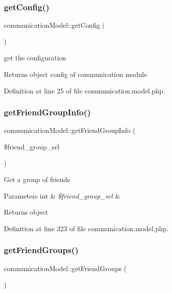 \subsubsection{\texorpdfstring{get\+Config()}{getConfig()}}
{\footnotesize\ttfamily communication\+Model\+::get\+Config (\begin{DoxyParamCaption}{ }\end{DoxyParamCaption})}

get the configuration \begin{DoxyReturn}{Returns}
object config of communication module 
\end{DoxyReturn}


Definition at line 25 of file communication.\+model.\+php.

\hypertarget{classcommunicationModel_a4ccd810d8c48ef4856da8fe986beb60a}{}\label{classcommunicationModel_a4ccd810d8c48ef4856da8fe986beb60a} 
\subsubsection{\texorpdfstring{get\+Friend\+Group\+Info()}{getFriendGroupInfo()}}
{\footnotesize\ttfamily communication\+Model\+::get\+Friend\+Group\+Info (\begin{DoxyParamCaption}\item[{}]{\$friend\+\_\+group\+\_\+srl }\end{DoxyParamCaption})}

Get a group of friends 
\begin{DoxyParams}[1]{Parameters}
int & {\em \$friend\+\_\+group\+\_\+srl} & \\
\hline
\end{DoxyParams}
\begin{DoxyReturn}{Returns}
object 
\end{DoxyReturn}


Definition at line 323 of file communication.\+model.\+php.

\hypertarget{classcommunicationModel_a670b024aba464aee04e81fd2ae846fc5}{}\label{classcommunicationModel_a670b024aba464aee04e81fd2ae846fc5} 
\subsubsection{\texorpdfstring{get\+Friend\+Groups()}{getFriendGroups()}}
{\footnotesize\ttfamily communication\+Model\+::get\+Friend\+Groups (\begin{DoxyParamCaption}{ }\end{DoxyParamCaption})}


